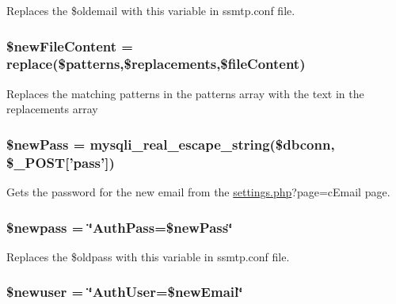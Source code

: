 \-Replaces the \$oldemail with this variable in ssmtp.\-conf file. \hypertarget{changeEmail_8php_abe4aedd9ba309b8e7a560c0436650e25}{
\subsubsection[{\$new\-File\-Content}]{\setlength{\rightskip}{0pt plus 5cm}\$new\-File\-Content = replace(\$patterns,\$replacements,\$file\-Content)}}\label{changeEmail_8php_abe4aedd9ba309b8e7a560c0436650e25}
\-Replaces the matching patterns in the patterns array with the text in the replacements array \hypertarget{changeEmail_8php_a37ca0c79236601207fcf80e029b8a573}{
\subsubsection[{\$new\-Pass}]{\setlength{\rightskip}{0pt plus 5cm}\$new\-Pass = mysqli\-\_\-real\-\_\-escape\-\_\-string(\$dbconn, \$\-\_\-\-P\-O\-S\-T\mbox{[}'pass'\mbox{]})}}\label{changeEmail_8php_a37ca0c79236601207fcf80e029b8a573}
\-Gets the password for the new email from the \hyperlink{settings_8php}{settings.\-php}?page=c\-Email page. \hypertarget{changeEmail_8php_af05fd45196336008a55cceff7365760f}{
\subsubsection[{\$newpass}]{\setlength{\rightskip}{0pt plus 5cm}\$newpass = \char`\"{}\-Auth\-Pass=\$new\-Pass\char`\"{}}}\label{changeEmail_8php_af05fd45196336008a55cceff7365760f}
\-Replaces the \$oldpass with this variable in ssmtp.\-conf file. \hypertarget{changeEmail_8php_a1133c11f7ee0057b9f6879abb058f87d}{
\subsubsection[{\$newuser}]{\setlength{\rightskip}{0pt plus 5cm}\$newuser = \char`\"{}\-Auth\-User=\$new\-Email\char`\"{}}}\label{changeEmail_8php_a1133c11f7ee0057b9f6879abb058f87d}
